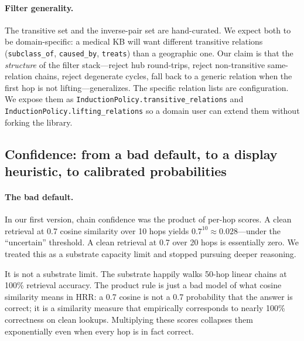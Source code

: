 \documentclass[11pt]{article}
\begin{document}
\paragraph{Filter generality.} The transitive set and the
inverse-pair set are hand-curated. We expect both to be
domain-specific: a medical KB will want different transitive
relations (\texttt{subclass\_of}, \texttt{caused\_by},
\texttt{treats}) than a geographic one. Our claim is that the
\emph{structure} of the filter stack---reject hub round-trips,
reject non-transitive same-relation chains, reject degenerate
cycles, fall back to a generic relation when the first hop is not
lifting---generalizes. The specific relation lists are
configuration. We expose them as
\texttt{InductionPolicy.transitive\_relations} and
\texttt{InductionPolicy.lifting\_relations} so a domain user can
extend them without forking the library.

\subsection{Confidence: from a bad default, to a display heuristic,
to calibrated probabilities}

\paragraph{The bad default.} In our first version, chain confidence
was the product of per-hop scores. A clean retrieval at 0.7 cosine
similarity over 10 hops yields $0.7^{10} \approx 0.028$---under the
``uncertain'' threshold. A clean retrieval at 0.7 over 20 hops is
essentially zero. We treated this as a substrate capacity limit and
stopped pursuing deeper reasoning.

It is not a substrate limit. The substrate happily walks 50-hop
linear chains at 100\% retrieval accuracy. The product rule is just
a bad model of what cosine similarity means in HRR: a 0.7 cosine
is not a 0.7 probability that the answer is correct; it is a
similarity measure that empirically corresponds to nearly 100\%
correctness on clean lookups. Multiplying these scores collapses
them exponentially even when every hop is in fact correct.
\end{document}
